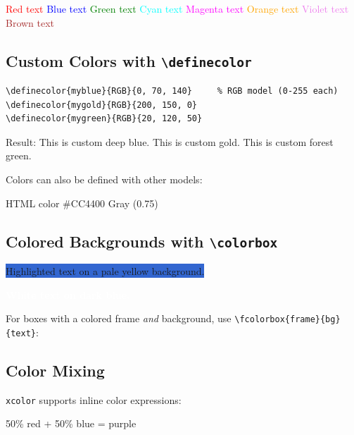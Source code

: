 \documentclass[12pt,a4paper]{article}
\begin{document}
\medskip
\textcolor{red}{Red text} \quad
\textcolor{blue}{Blue text} \quad
\textcolor{green}{Green text} \quad
\textcolor{cyan}{Cyan text} \quad
\textcolor{magenta}{Magenta text} \quad
\textcolor{orange}{Orange text} \quad
\textcolor{violet}{Violet text} \quad
\textcolor{brown}{Brown text}

\subsection{Custom Colors with \texttt{\textbackslash definecolor}}

\begin{verbatim}
\definecolor{myblue}{RGB}{0, 70, 140}     % RGB model (0-255 each)
\definecolor{mygold}{RGB}{200, 150, 0}
\definecolor{mygreen}{RGB}{20, 120, 50}
\end{verbatim}

Result:
\textcolor{myblue}{This is custom deep blue.} \quad
\textcolor{mygold}{This is custom gold.} \quad
\textcolor{mygreen}{This is custom forest green.}

\medskip
Colors can also be defined with other models:


\textcolor{warm}{HTML color \#CC4400} \quad
\textcolor{pale}{Gray (0.75)}

\subsection{Colored Backgrounds with \texttt{\textbackslash colorbox}}

\colorbox{highlight}{Highlighted text on a pale yellow background.}

\medskip
\colorbox{myblue}{\textcolor{white}{\textbf{White text on dark blue.}}}

\medskip
For boxes with a colored frame \emph{and} background, use
\verb|\fcolorbox{frame}{bg}{text}|:


\subsection{Color Mixing}

\texttt{xcolor} supports inline color expressions:

\textcolor{red!50!blue}{50\% red + 50\% blue = purple}
\end{document}
